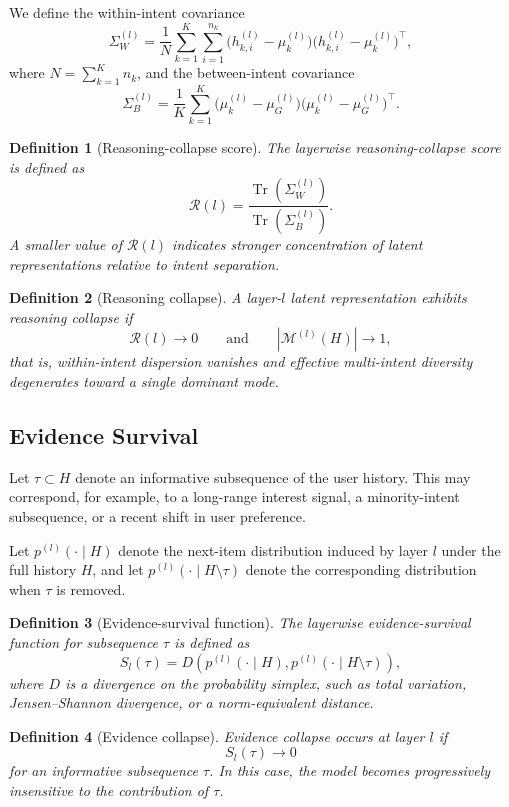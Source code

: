 \documentclass[11pt]{article}
\newtheorem{definition}{Definition}
\newcommand{\tr}{\operatorname{Tr}}
\begin{document}
We define the within-intent covariance
\[
\Sigma_W^{(l)} =
\frac{1}{N}
\sum_{k=1}^K \sum_{i=1}^{n_k}
\bigl(h_{k,i}^{(l)} - \mu_k^{(l)}\bigr)\bigl(h_{k,i}^{(l)} - \mu_k^{(l)}\bigr)^\top,
\]
where $N=\sum_{k=1}^K n_k$, and the between-intent covariance
\[
\Sigma_B^{(l)} =
\frac{1}{K}
\sum_{k=1}^K
\bigl(\mu_k^{(l)} - \mu_G^{(l)}\bigr)\bigl(\mu_k^{(l)} - \mu_G^{(l)}\bigr)^\top.
\]

\begin{definition}[Reasoning-collapse score]
The layerwise reasoning-collapse score is defined as
\[
\mathcal{R}(l) =
\frac{\tr(\Sigma_W^{(l)})}{\tr(\Sigma_B^{(l)})}.
\]
A smaller value of $\mathcal{R}(l)$ indicates stronger concentration of latent representations relative to intent separation.
\end{definition}

\begin{definition}[Reasoning collapse]
A layer-$l$ latent representation exhibits \emph{reasoning collapse} if
\[
\mathcal{R}(l) \to 0
\qquad \text{and} \qquad
|\mathcal{M}^{(l)}(H)| \to 1,
\]
that is, within-intent dispersion vanishes and effective multi-intent diversity degenerates toward a single dominant mode.
\end{definition}

\subsection{Evidence Survival}

Let $\tau \subset H$ denote an informative subsequence of the user history. This may correspond, for example, to a long-range interest signal, a minority-intent subsequence, or a recent shift in user preference.

Let $p^{(l)}(\cdot \mid H)$ denote the next-item distribution induced by layer $l$ under the full history $H$, and let $p^{(l)}(\cdot \mid H \setminus \tau)$ denote the corresponding distribution when $\tau$ is removed.

\begin{definition}[Evidence-survival function]
The layerwise evidence-survival function for subsequence $\tau$ is defined as
\[
S_l(\tau)
=
D\!\left(
p^{(l)}(\cdot \mid H),
p^{(l)}(\cdot \mid H \setminus \tau)
\right),
\]
where $D$ is a divergence on the probability simplex, such as total variation, Jensen--Shannon divergence, or a norm-equivalent distance.
\end{definition}

\begin{definition}[Evidence collapse]
Evidence collapse occurs at layer $l$ if
\[
S_l(\tau) \to 0
\]
for an informative subsequence $\tau$. In this case, the model becomes progressively insensitive to the contribution of $\tau$.
\end{definition}
\end{document}

